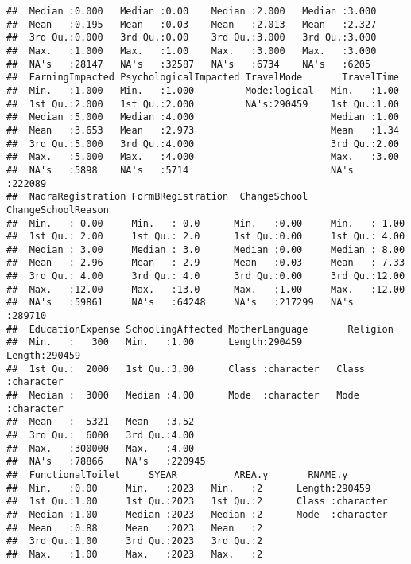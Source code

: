 \documentclass[
]{article}
\begin{document}
\begin{verbatim}
##  Median :0.000   Median :0.00    Median :2.000   Median :3.000  
##  Mean   :0.195   Mean   :0.03    Mean   :2.013   Mean   :2.327  
##  3rd Qu.:0.000   3rd Qu.:0.00    3rd Qu.:3.000   3rd Qu.:3.000  
##  Max.   :1.000   Max.   :1.00    Max.   :3.000   Max.   :3.000  
##  NA's   :28147   NA's   :32587   NA's   :6734    NA's   :6205   
##  EarningImpacted PsychologicalImpacted TravelMode       TravelTime    
##  Min.   :1.000   Min.   :1.000         Mode:logical   Min.   :1.00    
##  1st Qu.:2.000   1st Qu.:2.000         NA's:290459    1st Qu.:1.00    
##  Median :5.000   Median :4.000                        Median :1.00    
##  Mean   :3.653   Mean   :2.973                        Mean   :1.34    
##  3rd Qu.:5.000   3rd Qu.:4.000                        3rd Qu.:2.00    
##  Max.   :5.000   Max.   :4.000                        Max.   :3.00    
##  NA's   :5898    NA's   :5714                         NA's   :222089  
##  NadraRegistration FormBRegistration  ChangeSchool    ChangeSchoolReason
##  Min.   : 0.00     Min.   : 0.0      Min.   :0.00     Min.   : 1.00     
##  1st Qu.: 2.00     1st Qu.: 2.0      1st Qu.:0.00     1st Qu.: 4.00     
##  Median : 3.00     Median : 3.0      Median :0.00     Median : 8.00     
##  Mean   : 2.96     Mean   : 2.9      Mean   :0.03     Mean   : 7.33     
##  3rd Qu.: 4.00     3rd Qu.: 4.0      3rd Qu.:0.00     3rd Qu.:12.00     
##  Max.   :12.00     Max.   :13.0      Max.   :1.00     Max.   :12.00     
##  NA's   :59861     NA's   :64248     NA's   :217299   NA's   :289710    
##  EducationExpense SchoolingAffected MotherLanguage       Religion        
##  Min.   :   300   Min.   :1.00      Length:290459      Length:290459     
##  1st Qu.:  2000   1st Qu.:3.00      Class :character   Class :character  
##  Median :  3000   Median :4.00      Mode  :character   Mode  :character  
##  Mean   :  5321   Mean   :3.52                                           
##  3rd Qu.:  6000   3rd Qu.:4.00                                           
##  Max.   :300000   Max.   :4.00                                           
##  NA's   :78866    NA's   :220945                                         
##  FunctionalToilet     SYEAR          AREA.y       RNAME.y         
##  Min.   :0.00     Min.   :2023   Min.   :2      Length:290459     
##  1st Qu.:1.00     1st Qu.:2023   1st Qu.:2      Class :character  
##  Median :1.00     Median :2023   Median :2      Mode  :character  
##  Mean   :0.88     Mean   :2023   Mean   :2                        
##  3rd Qu.:1.00     3rd Qu.:2023   3rd Qu.:2                        
##  Max.   :1.00     Max.   :2023   Max.   :2                        

\end{verbatim}
\end{document}
